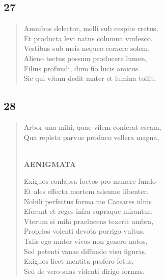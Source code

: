 \documentclass[11pt, a4paper]{report}
\begin{document}
            \subsection*{27}
      \begin{verse}
      Amnibus delector, molli sub cespite cretus, \\ Et producta levi natus columna virdesco. \\ Vestibus sub meis nequeo cernere solem, \\ Alieno tectus possum producere lumen, \\ Filius profundi, dum fio lucis amicus. \\ Sic qui vitam dedit mater et lumina tollit. \\ 
      \end{verse}
  
            \subsection*{28}
      \begin{verse}
      Arbor una mihi, quae vilem conferat escam, \\ Qua repleta parvus produco vellera magna, \\ 
        ﻿\pagebreak 
    \begin{center} \textbf{AENIGMATA} \end{center} \marginpar{[360]} Exiguos conlapsa foetos pro munere fundo \\ Et ales effecta mortem adsumo libenter. \\ Nobili perfectus forma me Caesares ulnis \\ Eferunt et reges infra supraque mirantur. \\ Vterum si mihi praelucens texerit umbra, \\ Proprios volenti devota porrigo vultus. \\ Talis ego mater vivos non genero natos, \\ Sed petenti vanas diffundo visu figuras. \\ Exiguos licet mentita profero fetus, \\ Sed de vero suas videnti dirigo formas. \\ 
      \end{verse}
  
\end{document}
